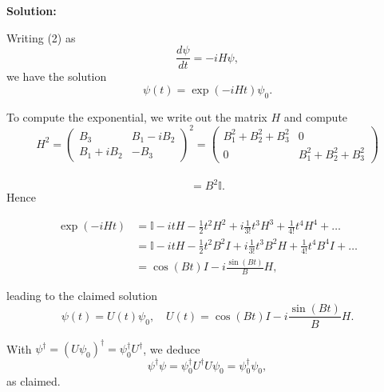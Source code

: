 \documentclass[10pt,landscape]{article}
\begin{document}
\begin{multicols}{2}
\textbf{Solution:} 

Writing (2) as
\[
\frac{d\psi}{dt} = -iH\psi,
\]
we have the solution
\[
\psi(t) = \exp(-iHt)\psi_0.
\]

To compute the exponential, we write out the matrix \(H\) and compute\\ \small
\[
H^2 = \begin{pmatrix}
B_3 & B_1 - iB_2 \\
B_1 + iB_2 & -B_3
\end{pmatrix}^2
= \begin{pmatrix}
B_1^2 + B_2^2 + B_3^2 & 0 \\
0 & B_1^2 + B_2^2 + B_3^2
\end{pmatrix}\]\\\[
= B^2 \mathbb{I}.
\]
\normalsize
Hence

\begin{align*}
\exp(-iHt) &= \mathbb{I} - itH - \frac{1}{2} t^2 H^2 + i \frac{1}{3!} t^3 H^3 + \frac{1}{4!} t^4 H^4 + \dots \\
&= \mathbb{I} - itH - \frac{1}{2} t^2 B^2 I + i \frac{1}{3!} t^3 B^2 H + \frac{1}{4!} t^4 B^4 I + \dots \\
&= \cos(Bt) I - i \frac{\sin(Bt)}{B} H,
\end{align*}

leading to the claimed solution\\
\[
\psi(t) = U(t) \psi_0, \quad U(t) = \cos(Bt)I - i \frac{\sin(Bt)}{B} H.
\]

With \(\psi^\dagger = (U\psi_0)^\dagger = \psi^\dagger_0 U^\dagger\), we deduce\\
\[
\psi^\dagger \psi = \psi^\dagger_0 U^\dagger U \psi_0 = \psi^\dagger_0 \psi_0,
\]
as claimed.



\end{multicols}
\end{document}
